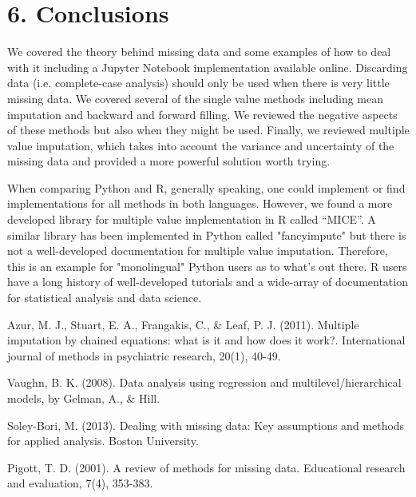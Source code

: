 \documentclass[a4paper]{article}
\begin{document}
\section{6. Conclusions}
\par\noindent We covered the theory behind missing data and some examples of how to deal with it including a Jupyter Notebook implementation available online. Discarding data (i.e. complete-case analysis) should only be used when there is very little missing data. We covered several of the single value methods including mean imputation and backward and forward filling. We reviewed the negative aspects of these methods but also when they might be used. Finally, we reviewed multiple value imputation, which takes into account the variance and uncertainty of the missing data and provided a more powerful solution worth trying.\\
\par\noindent When comparing Python and R, generally speaking, one could implement or find implementations for all methods in both languages. However, we found a more developed library for multiple value implementation in R called “MICE”. A similar library has been implemented in Python called "fancyimpute" but there is not a well-developed documentation for multiple value imputation. Therefore, this is an example for "monolingual" Python users as to what's out there. R users have a long history of well-developed tutorials and a wide-array of documentation for statistical analysis and data science.   

\begin{thebibliography}{9}
	Azur, M. J., Stuart, E. A., Frangakis, C., \& Leaf, P. J. (2011). Multiple imputation by chained 		equations: what is it and how does it work?. International journal of methods in psychiatric research, 		20(1), 40-49. 
	
    Vaughn, B. K. (2008). Data analysis using regression and multilevel/hierarchical models, by Gelman, 	A., \& Hill.
	
    Soley-Bori, M. (2013). Dealing with missing data: Key assumptions and methods for applied analysis. 	Boston University.
	
	Pigott, T. D. (2001). A review of methods for missing data. Educational research and evaluation, 7(4), 		353-383.
\end{thebibliography}
\end{document}

